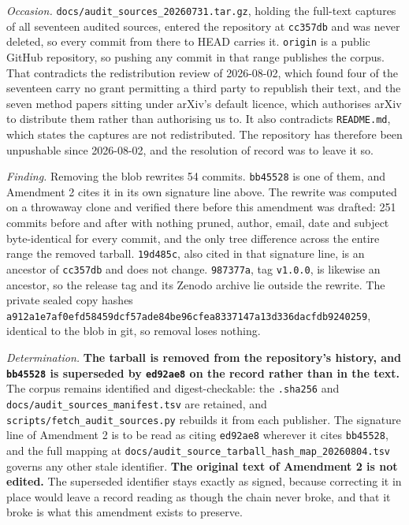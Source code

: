 \emph{Occasion.} \texttt{docs/\allowbreak{}audit\_sources\_20260731.tar.gz}, holding the full-text captures of all seventeen audited sources, entered the repository at \texttt{cc357db} and was never deleted, so every commit from there to HEAD carries it. \texttt{origin} is a public GitHub repository, so pushing any commit in that range publishes the corpus. That contradicts the redistribution review of 2026-08-02, which found four of the seventeen carry no grant permitting a third party to republish their text, and the seven method papers sitting under arXiv's default licence, which authorises arXiv to distribute them rather than authorising us to. It also contradicts \texttt{README.md}, which states the captures are not redistributed. The repository has therefore been unpushable since 2026-08-02, and the resolution of record was to leave it so.

\emph{Finding.} Removing the blob rewrites 54 commits. \texttt{bb45528} is one of them, and Amendment 2 cites it in its own signature line above. The rewrite was computed on a throwaway clone and verified there before this amendment was drafted: 251 commits before and after with nothing pruned, author, email, date and subject byte-identical for every commit, and the only tree difference across the entire range the removed tarball. \texttt{19d485c}, also cited in that signature line, is an ancestor of \texttt{cc357db} and does not change. \texttt{987377a}, tag \texttt{v1.0.0}, is likewise an ancestor, so the release tag and its Zenodo archive lie outside the rewrite. The private sealed copy hashes \texttt{a912a1e7af0efd58459dcf57ade84be96cfea8337147a13d336dacfdb9240259}, identical to the blob in git, so removal loses nothing.

\emph{Determination.} \textbf{The tarball is removed from the repository's history, and \texttt{bb45528} is superseded by \texttt{ed92ae8} on the record rather than in the text.} The corpus remains identified and digest-checkable: the \texttt{.sha256} and \texttt{docs/\allowbreak{}audit\_sources\_manifest.tsv} are retained, and \texttt{scripts/\allowbreak{}fetch\_audit\_sources.py} rebuilds it from each publisher. The signature line of Amendment 2 is to be read as citing \texttt{ed92ae8} wherever it cites \texttt{bb45528}, and the full mapping at \texttt{docs/\allowbreak{}audit\_source\_tarball\_hash\_map\_20260804.tsv} governs any other stale identifier. \textbf{The original text of Amendment 2 is not edited.} The superseded identifier stays exactly as signed, because correcting it in place would leave a record reading as though the chain never broke, and that it broke is what this amendment exists to preserve.


